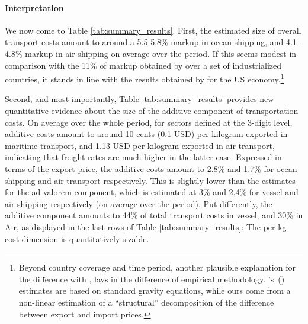\documentclass[a4paper,11pt]{article}
\newcommand\cites[1]{\citeauthor{#1}'s\ (\citeyear{#1})}
\begin{document}



\paragraph{Interpretation} We now come to Table \ref{tab:summary_results}. First, the estimated size of overall transport costs amount to around a 5.5-5.8\% markup in ocean shipping, and 4.1-4.8\% markup in air shipping on average over the period.
If this seems modest in comparison with the 11\% of markup obtained by \cite{anderson_wincoop_jel} over a set of industrialized countries, it stands in line with the results obtained by \cite{hummels2007} for the US economy.\footnote{Beyond country coverage and time period, another plausible explanation for the difference with \cite{anderson_wincoop_jel}, lays in the difference of empirical methodology.
\cites{anderson_wincoop_jel} estimates are based on standard gravity equations, while ours come from a non-linear estimation of a ``structural'' decomposition of the difference between export and import prices.}

Second, and most importantly, Table \ref{tab:summary_results} provides new quantitative evidence about the size of the additive component of transportation costs.
On average over the whole period, for sectors defined at the 3-digit level, additive costs amount to around 10 cents (0.1 USD) per kilogram exported in maritime transport, and 1.13 USD per kilogram exported in air transport, indicating that freight rates are much higher in the latter case.
Expressed in terms of the export price, the additive costs amount to 2.8\% and 1.7\% for ocean shipping and air transport respectively.
This is slightly lower than the estimates for the ad-valorem component, which is estimated at 3\% and 2.4\% for vessel and air shipping respectively (on average over the period).
Put differently, the additive component amounts to 44\% of total transport costs in vessel, and 30\% in Air, as displayed in the last rows of Table \ref{tab:summary_results}: The per-kg cost dimension is quantitatively sizable.
\end{document}
